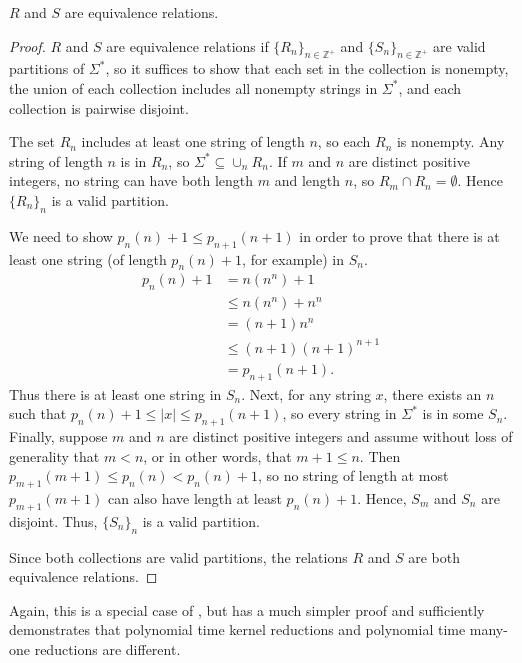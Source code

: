 \begin{lemma}
  $R$ and $S$ are equivalence relations.
\end{lemma}
\begin{proof}
  $R$ and $S$ are equivalence relations if $\{R_n\}_{n \in \mathbb{Z}^+}$ and $\{S_n\}_{n \in \mathbb{Z}^+}$ are valid partitions of $\Sigma^*$, so it suffices to show that each set in the collection is nonempty, the union of each collection includes all nonempty strings in $\Sigma^*$, and each collection is pairwise disjoint.

  The set $R_n$ includes at least one string of length $n$, so each $R_n$ is nonempty.
  Any string of length $n$ is in $R_n$, so $\Sigma^* \subseteq \cup_n R_n$.
  If $m$ and $n$ are distinct positive integers, no string can have both length $m$ and length $n$, so $R_m \cap R_n = \emptyset$.
  Hence $\{R_n\}_n$ is a valid partition.

  We need to show $p_n(n) + 1 \leq p_{n + 1}(n + 1)$ in order to prove that there is at least one string (of length $p_n(n) + 1$, for example) in $S_n$.
  \begin{align*}
    p_n(n) + 1 &= n (n^n) + 1 \\
    &\leq n (n^n) + n^n \\ %
    &= (n + 1) n^n \\
    &\leq (n + 1) (n + 1)^{n + 1} \\
    &= p_{n + 1}(n + 1).
  \end{align*}
  Thus there is at least one string in $S_n$.
  Next, for any string $x$, there exists an $n$ such that $p_n(n) + 1 \leq |x| \leq p_{n + 1}(n + 1)$, so every string in $\Sigma^*$ is in some $S_n$.
  Finally, suppose $m$ and $n$ are distinct positive integers and assume without loss of generality that $m < n$, or in other words, that $m + 1 \leq n$.
  Then $p_{m + 1}(m + 1) \leq p_n(n) < p_n(n) + 1$, so no string of length at most $p_{m + 1}(m + 1)$ can also have length at least $p_n(n) + 1$.
  Hence, $S_m$ and $S_n$ are disjoint.
  Thus, $\{S_n\}_n$ is a valid partition.

  Since both collections are valid partitions, the relations $R$ and $S$ are both equivalence relations.
\end{proof}

Again, this is a special case of \autocite[Theorem~5.1]{bcffm}, but has a much simpler proof and sufficiently demonstrates that polynomial time kernel reductions and polynomial time many-one reductions are different.

